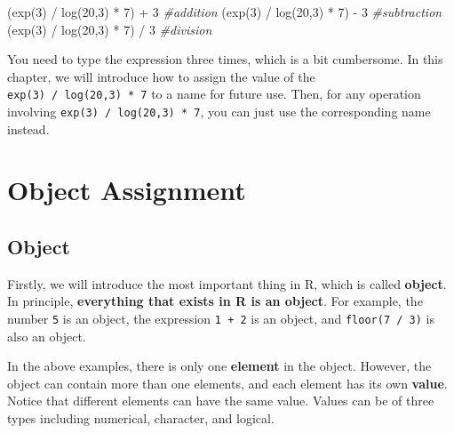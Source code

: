 \documentclass[
]{book}
\newenvironment{Shaded}{\begin{snugshade}}{\end{snugshade}}
\newcommand{\CommentTok}[1]{\textcolor[rgb]{0.56,0.35,0.01}{\textit{#1}}}
\newcommand{\DecValTok}[1]{\textcolor[rgb]{0.00,0.00,0.81}{#1}}
\newcommand{\FunctionTok}[1]{\textcolor[rgb]{0.00,0.00,0.00}{#1}}
\newcommand{\NormalTok}[1]{#1}
\newcommand{\SpecialCharTok}[1]{\textcolor[rgb]{0.00,0.00,0.00}{#1}}
\begin{document}
\begin{Shaded}
\begin{Highlighting}[]
\NormalTok{(}\FunctionTok{exp}\NormalTok{(}\DecValTok{3}\NormalTok{) }\SpecialCharTok{/} \FunctionTok{log}\NormalTok{(}\DecValTok{20}\NormalTok{,}\DecValTok{3}\NormalTok{) }\SpecialCharTok{*} \DecValTok{7}\NormalTok{) }\SpecialCharTok{+} \DecValTok{3} \CommentTok{\#addition}
\NormalTok{(}\FunctionTok{exp}\NormalTok{(}\DecValTok{3}\NormalTok{) }\SpecialCharTok{/} \FunctionTok{log}\NormalTok{(}\DecValTok{20}\NormalTok{,}\DecValTok{3}\NormalTok{) }\SpecialCharTok{*} \DecValTok{7}\NormalTok{) }\SpecialCharTok{{-}} \DecValTok{3} \CommentTok{\#subtraction}
\NormalTok{(}\FunctionTok{exp}\NormalTok{(}\DecValTok{3}\NormalTok{) }\SpecialCharTok{/} \FunctionTok{log}\NormalTok{(}\DecValTok{20}\NormalTok{,}\DecValTok{3}\NormalTok{) }\SpecialCharTok{*} \DecValTok{7}\NormalTok{) }\SpecialCharTok{/} \DecValTok{3} \CommentTok{\#division}
\end{Highlighting}
\end{Shaded}

You need to type the expression three times, which is a bit cumbersome. In this chapter, we will introduce how to assign the value of the \texttt{exp(3)\ /\ log(20,3)\ *\ 7} to a name for future use. Then, for any operation involving \texttt{exp(3)\ /\ log(20,3)\ *\ 7}, you can just use the corresponding name instead.

\hypertarget{Object-Assignment}{%
\section{Object Assignment}\label{Object-Assignment}}

\hypertarget{object}{%
\subsection{Object}\label{object}}

Firstly, we will introduce the most important thing in R, which is called \textbf{object}. In principle, \textbf{everything that exists in R is an object}. For example, the number \texttt{5} is an object, the expression \texttt{1\ +\ 2} is an object, and \texttt{floor(7\ /\ 3)} is also an object.

In the above examples, there is only one \textbf{element} in the object. However, the object can contain more than one elements, and each element has its own \textbf{value}. Notice that different elements can have the same value. Values can be of three types including numerical, character, and logical.
\end{document}
